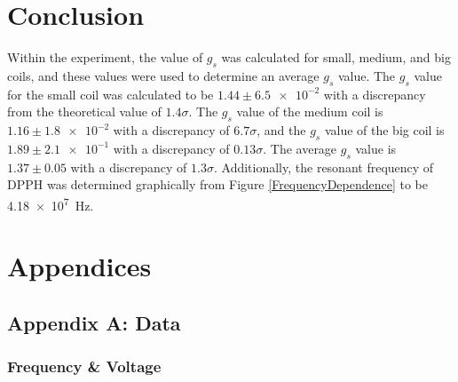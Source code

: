 \documentclass[a4paper]{article}
\begin{document}
\section{Conclusion}
\qq Within the experiment, the value of \( g_s \) was calculated for small,
medium, and big coils, and these values were used to determine an average
\( g_s \) value. The \( g_s \) value for the small coil was calculated to be
\( 1.44 \pm \num{6.5e-2} \) with a discrepancy from the theoretical value of
\( 1.4 \sigma \). The \( g_s \) value of the medium coil is
\( 1.16 \pm \num{1.8e-2} \) with a discrepancy of \( 6.7 \sigma \), and the
\( g_s \) value of the big coil is \( 1.89 \pm \num{2.1e-1} \) with a
discrepancy of \( 0.13 \sigma \). The average \( g_s \) value is
\( 1.37 \pm 0.05 \) with a discrepancy of \( 1.3 \sigma \). Additionally, the
resonant frequency of DPPH was determined graphically from Figure
\ref{FrequencyDependence} to be \SI{4.18e7}{\hertz}.

\section{Appendices}

\subsection{Appendix A: Data}

\subsubsection{Frequency \& Voltage}
\end{document}
